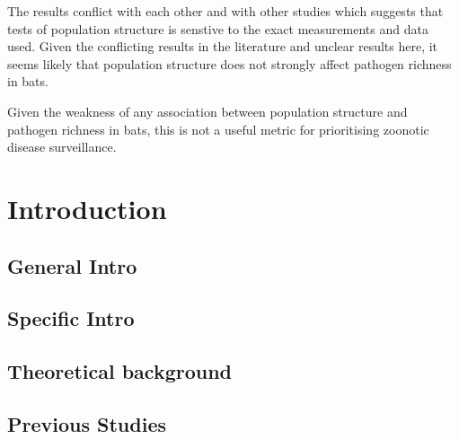 The results conflict with each other and with other studies which suggests that tests of population structure is senstive to the exact measurements and data used.
Given the conflicting results in the literature and unclear results here, it seems likely that population structure does not strongly affect pathogen richness in bats.


Given the weakness of any association between population structure and pathogen richness in bats, this is not a useful metric for prioritising zoonotic disease surveillance.







\clearpage
\section{Introduction}

\subsection{General Intro}




\subsection{Specific Intro}



\subsection{Theoretical background}

\subsection{Previous Studies}

